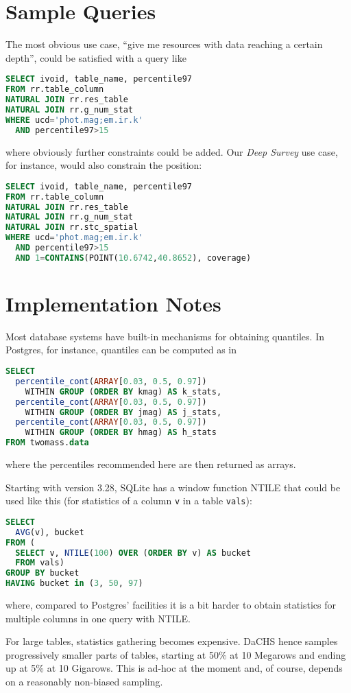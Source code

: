 \documentclass[11pt,a4paper]{ivoa}
\begin{document}
\section{Sample Queries}

The most obvious use case, ``give me resources with data reaching a
certain depth'', could be satisfied with a query like

\begin{lstlisting}[language=SQL]
SELECT ivoid, table_name, percentile97
FROM rr.table_column
NATURAL JOIN rr.res_table
NATURAL JOIN rr.g_num_stat
WHERE ucd='phot.mag;em.ir.k'
  AND percentile97>15
\end{lstlisting}

where obviously further constraints could be added.  Our \emph{Deep
Survey} use case, for instance, would also constrain the position:

\begin{lstlisting}[language=SQL]
SELECT ivoid, table_name, percentile97
FROM rr.table_column
NATURAL JOIN rr.res_table
NATURAL JOIN rr.g_num_stat
NATURAL JOIN rr.stc_spatial
WHERE ucd='phot.mag;em.ir.k'
  AND percentile97>15
  AND 1=CONTAINS(POINT(10.6742,40.8652), coverage)
\end{lstlisting}

\section{Implementation Notes}

Most database systems have built-in mechanisms for obtaining
quantiles.  In Postgres, for instance, quantiles can be computed as in

\begin{lstlisting}[language=SQL]
SELECT 
  percentile_cont(ARRAY[0.03, 0.5, 0.97]) 
    WITHIN GROUP (ORDER BY kmag) AS k_stats,
  percentile_cont(ARRAY[0.03, 0.5, 0.97]) 
    WITHIN GROUP (ORDER BY jmag) AS j_stats,
  percentile_cont(ARRAY[0.03, 0.5, 0.97]) 
    WITHIN GROUP (ORDER BY hmag) AS h_stats
FROM twomass.data
\end{lstlisting}

where the percentiles recommended here are then returned as arrays.

Starting with version 3.28, SQLite has a window function NTILE that could be
used like this (for statistics of a column \verb|v| in a table
\verb|vals|):

\begin{lstlisting}[language=SQL]
SELECT 
  AVG(v), bucket 
FROM (
  SELECT v, NTILE(100) OVER (ORDER BY v) AS bucket 
  FROM vals) 
GROUP BY bucket 
HAVING bucket in (3, 50, 97)
\end{lstlisting}

where, compared to Postgres' facilities it is a bit harder to obtain
statistics for multiple columns in one query with NTILE.

For large tables, statistics gathering becomes expensive.  DaCHS hence
samples progressively smaller parts of tables, starting at 50\% at 10
Megarows and ending up at 5\% at 10 Gigarows.  This is ad-hoc at the
moment and, of course, depends on a reasonably non-biased sampling.


\end{document}
